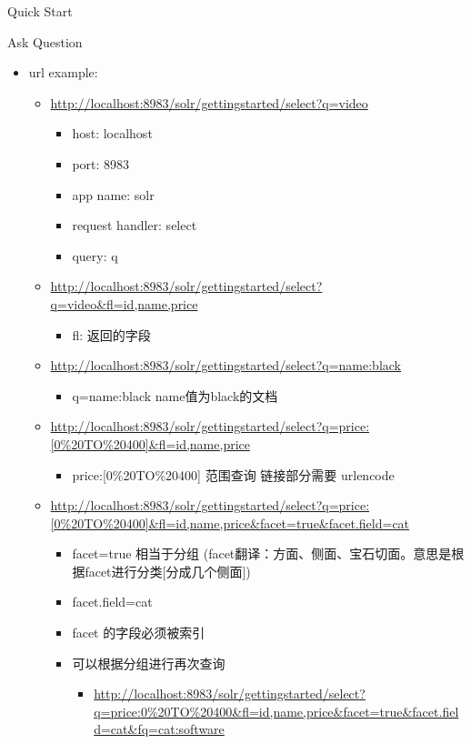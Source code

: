 \documentclass[presentation]{beamer}
\begin{document}
\begin{frame}[fragile,label={sec:org3661264}]{Quick Start}
\begin{block}{Ask Question}
\begin{itemize}
\item url example:
\begin{itemize}
\item \url{http://localhost:8983/solr/gettingstarted/select?q=video}
\begin{itemize}
\item host: localhost
\item port: 8983
\item app name: solr
\item request handler: select
\item query: q
\end{itemize}
\item \url{http://localhost:8983/solr/gettingstarted/select?q=video\&fl=id,name,price}
\begin{itemize}
\item fl: 返回的字段
\end{itemize}
\item \url{http://localhost:8983/solr/gettingstarted/select?q=name:black}
\begin{itemize}
\item q=name:black      name值为black的文档
\end{itemize}
\item \url{http://localhost:8983/solr/gettingstarted/select?q=price:[0\%20TO\%20400]\&fl=id,name,price}
\begin{itemize}
\item price:[0\%20TO\%20400]    范围查询 链接部分需要 urlencode
\end{itemize}
\item \url{http://localhost:8983/solr/gettingstarted/select?q=price:[0\%20TO\%20400]\&fl=id,name,price\&facet=true\&facet.field=cat}
\begin{itemize}
\item facet=true 相当于分组 (facet翻译：方面、侧面、宝石切面。意思是根据facet进行分类[分成几个侧面])
\item facet.field=cat
\item facet 的字段必须被索引
\item 可以根据分组进行再次查询
\begin{itemize}
\item \url{http://localhost:8983/solr/gettingstarted/select?q=price:0\%20TO\%20400\&fl=id,name,price\&facet=true\&facet.field=cat\&fq=cat:software}
\end{itemize}
\end{itemize}

\end{itemize}
\end{itemize}
\end{block}
\end{frame}
\end{document}
